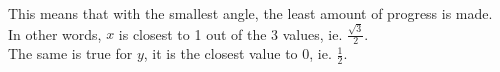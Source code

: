 \documentclass[preview]{standalone}
\begin{document}
\begin{center}
This means that with the smallest angle, the least amount of progress is made.\\ In other words, $x$ is closest to 1 out of the 3 values, ie. $ \frac{\sqrt{3}}{2} $. \\ The same is true for $y$, it is the closest value to 0, ie. $\frac{1}{2}.$
\end{center}
\end{document}
